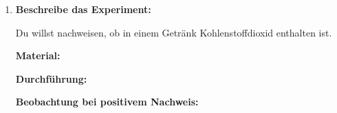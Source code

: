 \begin{enumerate}[label=\arabic*.]
    \vspace{1cm}

    \item \textbf{Beschreibe das Experiment:}
    \vspace{0.5cm}

    Du willst nachweisen, ob in einem Getränk Kohlenstoffdioxid enthalten ist.

    \textbf{Material:} \underline{\hspace{8cm}}

    \textbf{Durchführung:} 
    \vspace{2cm}

    \textbf{Beobachtung bei positivem Nachweis:}
    \vspace{1cm}

\end{enumerate}